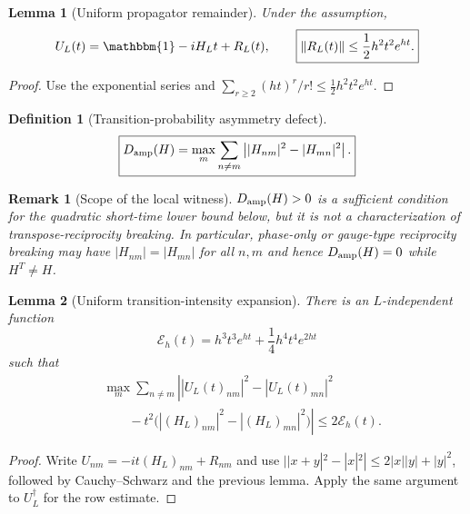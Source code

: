 \documentclass[reprint,amsmath,amssymb,aps,nofootinbib]{revtex4-2}
\newtheorem{definition}{Definition}
\newtheorem{lemma}{Lemma}
\newtheorem{remark}{Remark}
\newcommand{\id}{\mathbbm{1}}
\newcommand{\Damp}{D_{\rm amp}}
\newcommand{\norm}[1]{\left\lVert #1\right\rVert}
\begin{document}
\begin{lemma}[Uniform propagator remainder]
Under the assumption,
\begin{equation}
U_L(t)=\id-iH_Lt+R_L(t),
\qquad
\boxed{\norm{R_L(t)}\le\frac12h^2t^2e^{ht}.}
\end{equation}
\end{lemma}

\begin{proof}
Use the exponential series and
$\sum_{r\ge2}(ht)^r/r!\le\frac12h^2t^2e^{ht}$.
\end{proof}

\begin{definition}[Transition-probability asymmetry defect]
\begin{equation}
\boxed{
\Damp(H)=\max_m\sum_{n\ne m}
\left||H_{nm}|^2-|H_{mn}|^2\right|.}
\end{equation}
\end{definition}

\begin{remark}[Scope of the local witness]
$\Damp(H)>0$ is a sufficient condition for the quadratic short-time lower bound below, but it is
not a characterization of transpose-reciprocity breaking. In particular, phase-only or gauge-type
reciprocity breaking may have $|H_{nm}|=|H_{mn}|$ for all $n,m$ and hence $\Damp(H)=0$ while
$H^T\ne H$.\end{remark}

\begin{lemma}[Uniform transition-intensity expansion]
There is an $L$-independent function
\begin{equation}
\mathcal E_h(t)=h^3t^3e^{ht}+\frac14h^4t^4e^{2ht}
\end{equation}
such that
\begin{equation}
\begin{aligned}
&\max_m\sum_{n\ne m}
\left|
|U_L(t)_{nm}|^2-|U_L(t)_{mn}|^2\right.\\
&\left.\qquad
-t^2\big(|(H_L)_{nm}|^2-|(H_L)_{mn}|^2\big)
\right|
\le2\mathcal E_h(t).
\end{aligned}
\end{equation}
\end{lemma}

\begin{proof}
Write $U_{nm}=-it(H_L)_{nm}+R_{nm}$ and use
$||x+y|^2-|x|^2|\le2|x||y|+|y|^2$, followed by Cauchy--Schwarz and the previous lemma.
Apply the same argument to $U_L^\dagger$ for the row estimate.
\end{proof}
\end{document}
